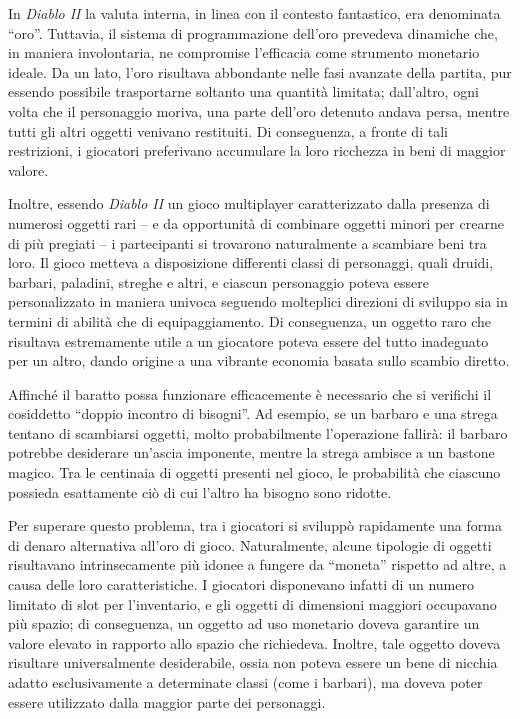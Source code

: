 \documentclass[
  a5paper,
  smalldemyvopaper,10pt,twoside,onecolumn,openright,extrafontsizes,hidelinks]{memoir}
\begin{document}
In \emph{Diablo II} la valuta interna, in linea con il contesto
fantastico, era denominata ``oro''. Tuttavia, il sistema di
programmazione dell'oro prevedeva dinamiche che, in maniera
involontaria, ne compromise l'efficacia come strumento monetario ideale.
Da un lato, l'oro risultava abbondante nelle fasi avanzate della
partita, pur essendo possibile trasportarne soltanto una quantità
limitata; dall'altro, ogni volta che il personaggio moriva, una parte
dell'oro detenuto andava persa, mentre tutti gli altri oggetti venivano
restituiti. Di conseguenza, a fronte di tali restrizioni, i giocatori
preferivano accumulare la loro ricchezza in beni di maggior valore.

Inoltre, essendo \emph{Diablo II} un gioco multiplayer caratterizzato
dalla presenza di numerosi oggetti rari -- e da opportunità di combinare
oggetti minori per crearne di più pregiati -- i partecipanti si
trovarono naturalmente a scambiare beni tra loro. Il gioco metteva a
disposizione differenti classi di personaggi, quali druidi, barbari,
paladini, streghe e altri, e ciascun personaggio poteva essere
personalizzato in maniera univoca seguendo molteplici direzioni di
sviluppo sia in termini di abilità che di equipaggiamento. Di
conseguenza, un oggetto raro che risultava estremamente utile a un
giocatore poteva essere del tutto inadeguato per un altro, dando origine
a una vibrante economia basata sullo scambio diretto.

Affinché il baratto possa funzionare efficacemente è necessario che si
verifichi il cosiddetto ``doppio incontro di bisogni''. Ad esempio, se
un barbaro e una strega tentano di scambiarsi oggetti, molto
probabilmente l'operazione fallirà: il barbaro potrebbe desiderare
un'ascia imponente, mentre la strega ambisce a un bastone magico. Tra le
centinaia di oggetti presenti nel gioco, le probabilità che ciascuno
possieda esattamente ciò di cui l'altro ha bisogno sono ridotte.

Per superare questo problema, tra i giocatori si sviluppò rapidamente
una forma di denaro alternativa all'oro di gioco. Naturalmente, alcune
tipologie di oggetti risultavano intrinsecamente più idonee a fungere da
``moneta'' rispetto ad altre, a causa delle loro caratteristiche. I
giocatori disponevano infatti di un numero limitato di slot per
l'inventario, e gli oggetti di dimensioni maggiori occupavano più
spazio; di conseguenza, un oggetto ad uso monetario doveva garantire un
valore elevato in rapporto allo spazio che richiedeva. Inoltre, tale
oggetto doveva risultare universalmente desiderabile, ossia non poteva
essere un bene di nicchia adatto esclusivamente a determinate classi
(come i barbari), ma doveva poter essere utilizzato dalla maggior parte
dei personaggi.
\end{document}
